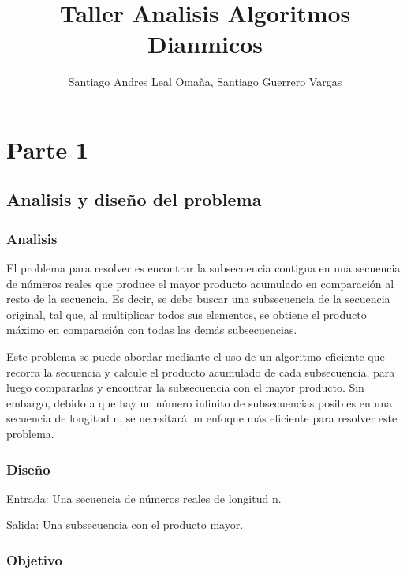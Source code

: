 \documentclass[11pt]{article}
\title{Taller Analisis Algoritmos Dianmicos}
\author{Santiago Andres Leal Omaña, Santiago Guerrero Vargas}
\begin{document}
    
    \maketitle

    \hypertarget{parte-1}{%
\section{Parte 1}\label{parte-1}}

\hypertarget{analisis-y-diseuxf1o-del-problema}{%
\subsection{Analisis y diseño del
problema}\label{analisis-y-diseuxf1o-del-problema}}

\hypertarget{analisis}{%
\subsubsection{Analisis}\label{analisis}}

El problema para resolver es encontrar la subsecuencia contigua en una
secuencia de números reales que produce el mayor producto acumulado en
comparación al resto de la secuencia. Es decir, se debe buscar una
subsecuencia de la secuencia original, tal que, al multiplicar todos sus
elementos, se obtiene el producto máximo en comparación con todas las
demás subsecuencias.

Este problema se puede abordar mediante el uso de un algoritmo eficiente
que recorra la secuencia y calcule el producto acumulado de cada
subsecuencia, para luego compararlas y encontrar la subsecuencia con el
mayor producto. Sin embargo, debido a que hay un número infinito de
subsecuencias posibles en una secuencia de longitud n, se necesitará un
enfoque más eficiente para resolver este problema.

\hypertarget{diseuxf1o}{%
\subsubsection{Diseño}\label{diseuxf1o}}

Entrada: Una secuencia de números reales de longitud n.

Salida: Una subsecuencia con el producto mayor.

\hypertarget{objetivo}{%
\subsubsection{Objetivo}\label{objetivo}}
\end{document}
